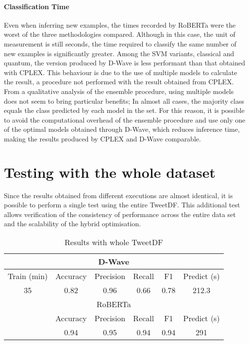 \paragraph{Classification Time} Even when inferring new examples, the times recorded by RoBERTa were the worst of the three methodologies compared. Although in this case, the unit of measurement is still seconds, the time required to classify the same number of new examples is significantly greater. Among the SVM variants, classical and quantum, the version produced by D-Wave is less performant than that obtained with CPLEX. This behaviour is due to the use of multiple models to calculate the result, a procedure not performed with the result obtained from CPLEX. From a qualitative analysis of the ensemble procedure, using multiple models does not seem to bring particular benefits; In almost all cases, the majority class equals the class predicted by each model in the set. For this reason, it is possible to avoid the computational overhead of the ensemble procedure and use only one of the optimal models obtained through D-Wave, which reduces inference time, making the results produced by CPLEX and D-Wave comparable.

\section{Testing with the whole dataset}

Since the results obtained from different executions are almost identical, it is possible to perform a single test using the entire TweetDF. This additional test allows verification of the consistency of performance across the entire data set and the scalability of the hybrid optimisation.

\begin{table}[h]
    \centering
    \begin{tabular}{cccccc}
    \toprule
    \multicolumn{6}{c}{D-Wave}                                       \\ \midrule
    Train (min) & Accuracy & Precision & Recall & F1   & Predict (s) \\
    35          & 0.82     & 0.96      & 0.66   & 0.78 & 212.3       \\ \bottomrule
    \toprule
    \multicolumn{6}{c}{RoBERTa}                                      \\ \midrule
                & Accuracy & Precision & Recall & F1   & Predict (s) \\
                & 0.94     & 0.95      & 0.94   & 0.94 & 291         \\ \bottomrule
    \end{tabular}
    \caption{Results with whole TweetDF}
    \label{tab:qsvm-fulldf}
\end{table}

